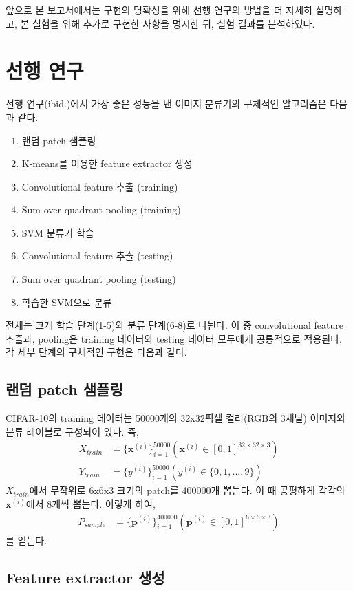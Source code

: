 \documentclass[a4paper,9pt]{article}
\begin{document}
\begin{multicols*}{2}
앞으로 본 보고서에서는 구현의 명확성을 위해 선행 연구의 방법을 더 자세히 설명하고, 본 실험을 위해 추가로 구현한 사항을 명시한 뒤, 실험 결과를 분석하였다.

\section{선행 연구}

선행 연구(ibid.)에서 가장 좋은 성능을 낸 이미지 분류기의 구체적인 알고리즘은 다음과 같다.
\begin{enumerate}
\item 랜덤 patch 샘플링
\item K-means를 이용한 feature extractor 생성
\item Convolutional feature 추출 (training)
\item Sum over quadrant pooling (training)
\item SVM 분류기 학습
\item Convolutional feature 추출 (testing)
\item Sum over quadrant pooling (testing)
\item 학습한 SVM으로 분류
\end{enumerate}
전체는 크게 학습 단계(1-5)와 분류 단계(6-8)로 나뉜다.
이 중 convolutional feature 추출과, pooling은 training 데이터와 testing 데이터 모두에게 공통적으로 적용된다.
각 세부 단계의 구체적인 구현은 다음과 같다.

\subsection{랜덤 patch 샘플링}

CIFAR-10의 training 데이터는 50000개의 32x32픽셀 컬러(RGB의 3채널) 이미지와 분류 레이블로 구성되어 있다.
즉,
\begin{align*}
    X_{train} &= \{ \mathbf{x}^{(i)} \}_{i=1}^{50000} ( \mathbf{x}^{(i)} \in [0, 1]^{32 \times 32 \times 3} ) \\
    Y_{train} &= \{ y^{(i)} \}_{i=1}^{50000} ( y^{(i)} \in \{0, 1, ..., 9\} )
\end{align*}
$X_{train}$에서 무작위로 6x6x3 크기의 patch를 400000개 뽑는다.
이 때 공평하게 각각의 $\mathbf{x}^{(i)}$에서 8개씩 뽑는다.
이렇게 하여,
\begin{align*}
    P_{sample} &= \{ \mathbf{p}^{(i)} \}_{i=1}^{400000} ( \mathbf{p}^{(i)} \in [0, 1]^{6 \times 6 \times 3} )
\end{align*}
를 얻는다.

\subsection{Feature extractor 생성}
\label{sec:feature_extractor}


\end{multicols*}
\end{document}
